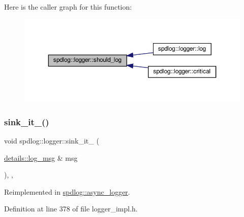Here is the caller graph for this function\+:
\nopagebreak
\begin{figure}[H]
\begin{center}
\leavevmode
\includegraphics[width=350pt]{classspdlog_1_1logger_a94c77395570c462953ded4188aaaf655_icgraph}
\end{center}
\end{figure}
\mbox{\label{classspdlog_1_1logger_a43ac8d73671a109cba253eadb0b049e2}} 
\subsubsection{\texorpdfstring{sink\+\_\+it\+\_\+()}{sink\_it\_()}}
{\footnotesize\ttfamily void spdlog\+::logger\+::sink\+\_\+it\+\_\+ (\begin{DoxyParamCaption}\item[{\hyperlink{structspdlog_1_1details_1_1log__msg}{details\+::log\+\_\+msg} \&}]{msg }\end{DoxyParamCaption})\hspace{0.3cm}{\ttfamily [inline]}, {\ttfamily [protected]}, {\ttfamily [virtual]}}



Reimplemented in \hyperlink{classspdlog_1_1async__logger_aefd367c3266773bfe756d34150705329}{spdlog\+::async\+\_\+logger}.



Definition at line 378 of file logger\+\_\+impl.\+h.

